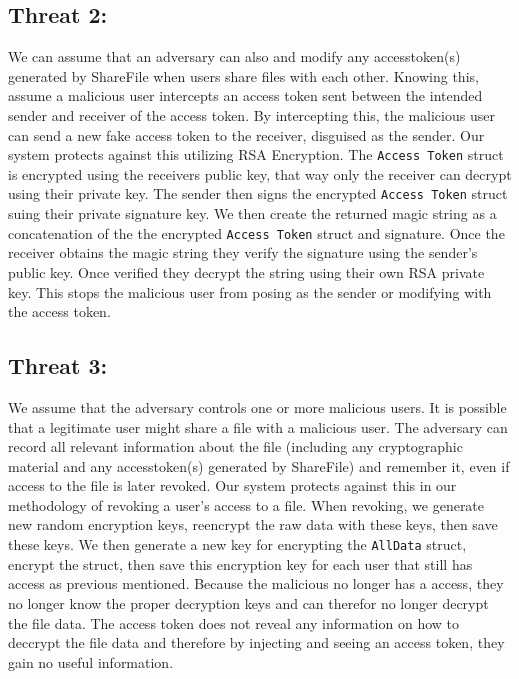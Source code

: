 \documentclass{article}
\begin{document}
\subsection{Threat 2:} %
We can assume that an adversary can also and modify any accesstoken(s) generated by ShareFile when users share files with each other. Knowing this, assume a malicious user intercepts an access token sent between the intended sender and receiver of the access token. By intercepting this, the malicious user can send a new fake access token to the receiver, disguised as the sender. Our system protects against this utilizing RSA Encryption. The \texttt{Access Token} struct is encrypted using the receivers public key, that way only the receiver can decrypt using their private key. The sender then signs the encrypted \texttt{Access Token} struct suing their private signature key. We then create the returned magic string as a concatenation of the  the encrypted \texttt{Access Token} struct and signature. Once the receiver obtains the magic string they verify the signature using the sender's public key. Once verified they decrypt the string using their own RSA private key. This stops the malicious user from posing as the sender or modifying with the access token.

\subsection{Threat 3: } %
We assume that the adversary controls one or more malicious users. It is possible that a legitimate user might share a file with a malicious user. The adversary can record all relevant information about the file (including any cryptographic material and any accesstoken(s) generated by ShareFile) and remember it, even if access to the file is later revoked. Our system protects against this in our methodology of revoking a user's access to a file. When revoking, we generate new random encryption keys, reencrypt the raw data with these keys, then save these keys. We then generate a new key for encrypting the \texttt{AllData} struct, encrypt the struct, then save this encryption key for each user that still has access as previous mentioned. Because the malicious no longer has a access, they no longer know the proper decryption keys and can therefor no longer decrypt the file data. The access token does not reveal any information on how to deccrypt the file data and therefore by injecting and seeing an access token, they gain no useful information.
\end{document}
